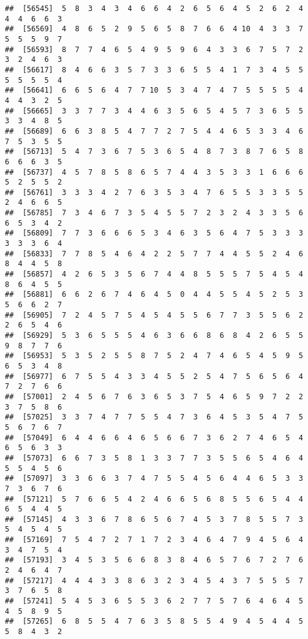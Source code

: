 \documentclass[
]{book}
\begin{document}
\begin{verbatim}
##  [56545]  5  8  3  4  3  4  6  6  4  2  6  5  6  4  5  2  6  2  4  4  4  6  6  3
##  [56569]  4  8  6  5  2  9  5  6  5  8  7  6  6  4 10  4  3  3  7  5  5  5  9  7
##  [56593]  8  7  7  4  6  5  4  9  5  9  6  4  3  3  6  7  5  7  2  3  2  4  6  3
##  [56617]  8  4  6  6  3  5  7  3  3  6  5  5  4  1  7  3  4  5  5  5  5  5  5  4
##  [56641]  6  6  5  6  4  7  7 10  5  3  4  7  4  7  5  5  5  5  4  4  4  3  2  5
##  [56665]  3  3  7  7  3  4  4  6  3  5  6  5  4  5  7  3  6  5  5  3  3  4  8  5
##  [56689]  6  6  3  8  5  4  7  7  2  7  5  4  4  6  5  3  3  4  6  7  5  3  5  5
##  [56713]  5  4  7  3  6  7  5  3  6  5  4  8  7  3  8  7  6  5  8  6  6  6  3  5
##  [56737]  4  5  7  8  5  8  6  5  7  4  4  3  5  3  3  1  6  6  6  5  2  5  5  2
##  [56761]  3  3  3  4  2  7  6  3  5  3  4  7  6  5  5  3  3  5  5  2  4  6  6  5
##  [56785]  7  3  4  6  7  3  5  4  5  5  7  2  3  2  4  3  3  5  6  6  5  3  4  2
##  [56809]  7  7  3  6  6  6  5  3  4  6  3  5  6  4  7  5  3  3  3  3  3  3  6  4
##  [56833]  7  7  8  5  4  6  4  2  2  5  7  7  4  4  5  5  2  4  6  8  4  4  5  8
##  [56857]  4  2  6  5  3  5  6  7  4  4  8  5  5  5  7  5  4  5  4  8  6  4  5  5
##  [56881]  6  6  2  6  7  4  6  4  5  0  4  4  5  5  4  5  2  5  3  5  6  6  2  7
##  [56905]  7  2  4  5  7  5  4  5  4  5  5  6  7  7  3  5  5  6  2  2  6  5  4  6
##  [56929]  5  3  6  5  5  5  4  6  3  6  6  8  6  8  4  2  6  5  5  9  8  7  7  6
##  [56953]  5  3  5  2  5  5  8  7  5  2  4  7  4  6  5  4  5  9  5  6  5  3  4  8
##  [56977]  6  7  5  5  4  3  3  4  5  5  2  5  4  7  5  6  5  6  4  7  2  7  6  6
##  [57001]  2  4  5  6  7  6  3  6  5  3  7  5  4  6  5  9  7  2  2  3  7  5  8  6
##  [57025]  3  3  7  4  7  7  5  5  4  7  3  6  4  5  3  5  4  7  5  5  6  7  6  7
##  [57049]  6  4  4  6  6  4  6  5  6  6  7  3  6  2  7  4  6  5  4  6  5  6  3  3
##  [57073]  6  6  7  3  5  8  1  3  3  7  7  3  5  5  6  5  4  6  4  5  5  4  5  6
##  [57097]  3  3  6  6  3  7  4  7  5  5  4  5  6  4  4  6  5  3  3  7  3  6  7  6
##  [57121]  5  7  6  6  5  4  2  4  6  6  5  6  8  5  5  6  5  4  4  6  5  4  4  5
##  [57145]  4  3  3  6  7  8  6  5  6  7  4  5  3  7  8  5  5  7  3  5  4  5  4  5
##  [57169]  7  5  4  7  2  7  1  7  2  3  4  6  4  7  9  4  5  6  4  3  4  7  5  4
##  [57193]  3  4  5  3  5  6  6  8  3  8  4  6  5  7  6  7  2  7  6  2  4  6  4  7
##  [57217]  4  4  4  3  3  8  6  3  2  3  4  5  4  3  7  5  5  5  7  3  7  6  5  8
##  [57241]  5  4  5  3  6  5  5  3  6  2  7  7  5  7  6  4  6  4  5  4  5  8  9  5
##  [57265]  6  8  5  5  4  7  6  3  5  8  5  5  4  9  4  5  4  4  5  5  8  4  3  2

\end{verbatim}
\end{document}
